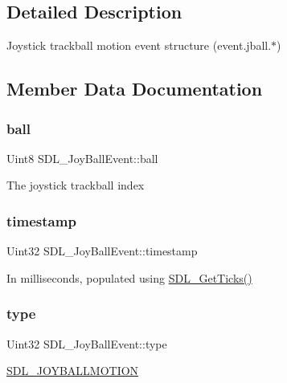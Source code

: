 \subsection{Detailed Description}
Joystick trackball motion event structure (event.\+jball.$\ast$) 

\subsection{Member Data Documentation}
\mbox{\label{struct_s_d_l___joy_ball_event_add4eb0daeaf95ae56e8c7cfcec560242}} 
\subsubsection{\texorpdfstring{ball}{ball}}
{\footnotesize\ttfamily Uint8 S\+D\+L\+\_\+\+Joy\+Ball\+Event\+::ball}

The joystick trackball index \mbox{\label{struct_s_d_l___joy_ball_event_aa8e4fb91af62e316bb9a3219ab76148d}} 
\subsubsection{\texorpdfstring{timestamp}{timestamp}}
{\footnotesize\ttfamily Uint32 S\+D\+L\+\_\+\+Joy\+Ball\+Event\+::timestamp}

In milliseconds, populated using \mbox{\hyperlink{_s_d_l__timer_8h_a0b9bc71d6287e0ffafdc3419760fe2b3}{S\+D\+L\+\_\+\+Get\+Ticks()}} \mbox{\label{struct_s_d_l___joy_ball_event_a0b192b95a043cb494b27ed9b27e84db1}} 
\subsubsection{\texorpdfstring{type}{type}}
{\footnotesize\ttfamily Uint32 S\+D\+L\+\_\+\+Joy\+Ball\+Event\+::type}

\mbox{\hyperlink{_s_d_l__events_8h_a3b589e89be6b35c02e0dd34a55f3fccaa78f859489cfd565c305c7f6f9d5b25c1}{S\+D\+L\+\_\+\+J\+O\+Y\+B\+A\+L\+L\+M\+O\+T\+I\+ON}} \mbox{\label{struct_s_d_l___joy_ball_event_a4e2e185717d529167cd0bea21093c454}} 
